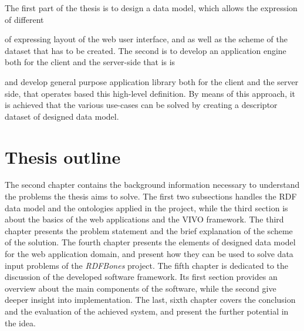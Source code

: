  


The first part of the thesis is to design a data model, which allows the expression of different 

 of expressing layout of the web user interface, and as well as the scheme of the dataset that has to be created. The second is to develop an application engine both for the client and the server-side that is is  
 
  and develop general purpose application library both for the client and the server side, that operates based this high-level definition. By means of this approach, it is achieved that the various use-cases can be solved by creating a descriptor dataset of designed data model.

\section{Thesis outline}

The second chapter contains the background information necessary to understand the problems the thesis aims to solve. The first two subsections handles the RDF data model and the ontologies applied in the project, while the third section is about the basics of the web applications and the VIVO framework. The third chapter presents the problem statement and the brief explanation of the scheme of the solution. The fourth chapter presents the elements of designed data model for the web application domain, and present how they can be used to solve data input problems of the \textit{RDFBones} project. The fifth chapter is dedicated to the discussion of the developed software framework. Its first section provides an overview about the main components of the software, while the second give deeper insight into implementation. The last, sixth chapter covers the conclusion and the evaluation of the achieved system, and present the further potential in the idea.
